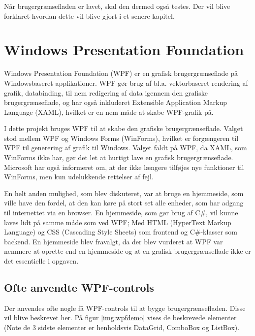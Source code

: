 
Når brugergrænsefladen er lavet, skal den dermed også testes. Der vil blive forklaret hvordan dette vil blive gjort i et senere kapitel. 

\section{Windows Presentation Foundation}

\cbstart

Windows Presentation Foundation (WPF) er en grafisk brugergrænseflade på Windowsbaseret applikationer. 
WPF gør brug af  bl.a. vektorbaseret rendering af grafik, databinding, til nem redigering af data igennem den grafiske brugergrænseflade, og har også inkluderet Extensible Application Markup Language (XAML), hvilket er en nem måde at skabe WPF-grafik på.\citep{wpf} 

I dette projekt bruges WPF til at skabe den grafiske brugergrænseflade. Valget stod mellem WPF og Windows Forms (WinForms), hvilket er forgængeren til WPF til generering af grafik til Windows. 
Valget faldt på WPF, da XAML, som WinForms ikke har, gør det let at hurtigt lave en grafisk brugergrænseflade. 
Microsoft har også informeret om, at der ikke længere tilføjes nye funktioner til WinForms, men kun udelukkende rettelser af fejl.\citep{winforms}

En helt anden mulighed, som blev diskuteret, var at bruge en hjemmeside, som ville have den fordel, at den kan køre på stort set alle enheder, som har adgang til internettet via en browser. En hjemmeside, som gør brug af C\#, vil kunne laves lidt på samme måde som ved WPF; Med HTML (HyperText Markup Language) og CSS (Cascading Style Sheets) som frontend og C\#-klasser som backend. 
En hjemmeside blev fravalgt, da der blev vurderet at WPF var nemmere at oprette end en hjemmeside og at en grafisk brugergrænseflade ikke er det essentielle i opgaven. 

\subsection{Ofte anvendte WPF-controls}
Der anvendes ofte nogle få WPF-controls til at bygge brugergrænsefladen.
Disse vil blive beskrevet her.
På figur \ref{img:wpfdemo} vises de beskrevede elementer (Note de 3 sidste elementer er henholdsvis DataGrid, ComboBox og ListBox).



